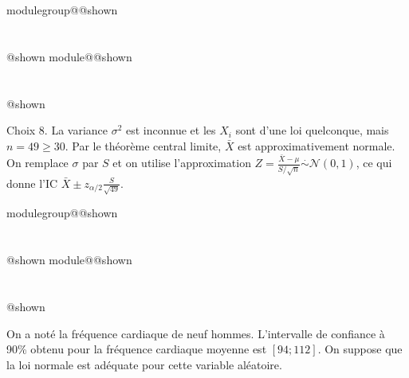 \documentclass{Evaluation}
\makeatletter
\newcommand{\currentmodulekey}{}
\newcommand{\currentmoduletitle}{}
\newcommand{\currentgroupkey}{}
\newcommand{\currentgrouptitle}{}
\newcommand{\showmoduleifneeded}{%
  \ifx\currentgroupkey\empty\else
    \expandafter\ifx\csname modulegroup@\currentgroupkey @shown\endcsname\relax
      \section*{\currentgrouptitle}%
      \expandafter\gdef\csname modulegroup@\currentgroupkey @shown\endcsname{1}%
    \fi
  \fi
  \expandafter\ifx\csname module@\currentmodulekey @shown\endcsname\relax
    \section*{\currentmoduletitle}%
    \expandafter\gdef\csname module@\currentmodulekey @shown\endcsname{1}%
  \fi
}
\newenvironment{A25}{\showmoduleifneeded}{}
\newenvironment{H26}{\showmoduleifneeded}{}
\makeatother
\begin{document}
\begin{questions}
\begin{A25}
\begin{parts}
\medskip
\begin{oneparcheckboxes}

 \end{oneparcheckboxes}\medskip
 \begin{solution}
 Choix 8. La variance $\sigma^2$ est inconnue et les $X_i$ sont d'une loi quelconque, mais $n = 49 \geq 30$. Par le théorème central limite, $\bar{X}$ est approximativement normale. On remplace $\sigma$ par $S$ et on utilise l'approximation $Z = \frac{\bar{X} - \mu}{S/\sqrt{n}} \stackrel{\cdot}{\sim} \mathcal{N}(0,1)$, ce qui donne l'IC $\bar{X} \pm z_{\alpha/2} \frac{S}{\sqrt{49}}$.
 \end{solution}
 \end{parts}
\end{A25}

\begin{H26}
\question {} %
On a noté la fréquence cardiaque de neuf hommes.
L'intervalle de confiance à 90\% obtenu pour la fréquence cardiaque moyenne est $[94; 112]$.
On suppose que la loi normale est adéquate pour cette variable aléatoire.

\end{H26}
\end{questions}
\end{document}
